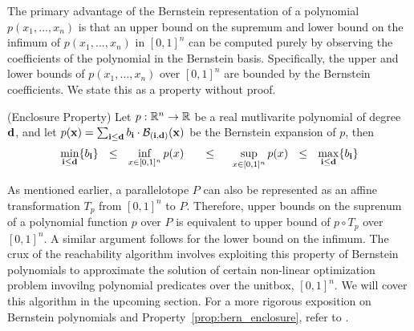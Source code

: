 
The primary advantage of the Bernstein representation of a polynomial $p(x_1,...,x_n)$ is that an upper bound on the supremum and lower bound on the infimum of $p(x_1,...,x_n)$ in $[0,1]^{n}$ can be computed purely by observing the coefficients of the polynomial in the Bernstein basis. Specifically, the upper and lower bounds of $p(x_1,\ldots,x_n)$ over $[0,1]^n$ are bounded by the Bernstein coefficients. We state this as a property without proof.
%
\begin{property} (Enclosure Property)
  \label{prop:bern_enclosure}
  Let $p: {\mathbb{R}}^n \rightarrow {\mathbb{R}}$ be a real mutlivarite polynomial of degree ${\bf d}$, and let $p({\bf x}) = \sum_{{\bf i} \leq {\bf d}} b_{\bf i} \cdot \mathcal{B}_{({\bf i},{\bf d})}({\bf x})$ be the Bernstein expansion of $p$, then
  $$
  \min_{{\bf i} \leq {\bf d}} \{b_{\bf i}\} ~~\leq~~ \inf_{x \in [0,1]^n} p(x) ~~~~~\leq~~~~ \sup_{x \in [0,1]^{n}} p(x) ~~\leq~~ \max_{{\bf i} \leq {\bf d}} \{b_{\bf i}\}
  $$
\end{property}


As mentioned earlier, a parallelotope $P$ can also be represented as an affine transformation $T_{p}$ from $[0,1]^{n}$ to $P$.
%
Therefore, upper bounds on the suprenum of a polynomial function $p$ over $P$ is equivalent to upper bound of $p \circ T_{p}$ over $[0,1]^{n}$.
%
A similar argument follows for the lower bound on the infimum.
%
The crux of the reachability algorithm involves exploiting this property of Bernstein polynomials to approximate the solution of certain non-linear optimization problem invovilng polynomial predicates over the unitbox, $[0,1]^n$.
%
We will cover this algorithm in the upcoming section.
%
For a more rigorous exposition on Bernstein polynomials and Property~\ref{prop:bern_enclosure}, refer to \cite{garloff2003bernstein}.


